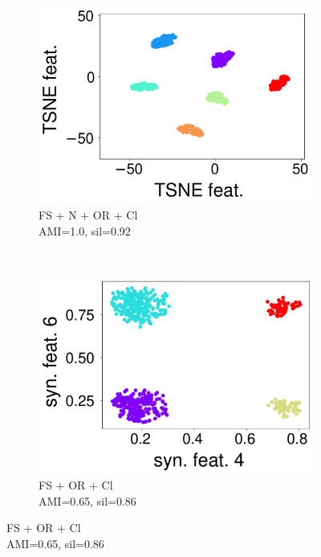 \begin{figure}[t]  
    \begin{subfigure}[t]{0.31\columnwidth}
        \centering
        \includegraphics[scale=.15]{chapters/data-centric/unsupervised/img/ft_sc_ou_cl.pdf}
        \caption{FS + N + OR + Cl\\ \scriptsize{AMI=1.0, sil=0.92}}
        \label{clustering-fig:d1}
    \end{subfigure}
    ~~
    \begin{subfigure}[t]{0.31\columnwidth}
        \centering
        \includegraphics[scale=.15]{chapters/data-centric/unsupervised/img/dashboard_1_pred.pdf}      
        \caption{FS + OR + Cl\\ \scriptsize{AMI=0.65, sil=0.86}}
        \label{clustering-fig:d3}
    \end{subfigure}

\end{figure}
